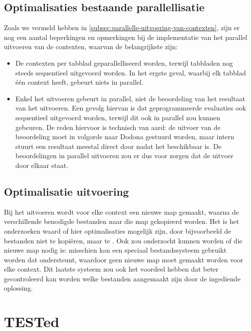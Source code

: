\subsection{Optimalisaties bestaande parallellisatie}\label{subsec:optimalisaties-bestaande-parallellisatie}

Zoals we vermeld hebben in \cref{subsec:parallelle-uitvoering-van-contexten}, zijn er nog een aantal beperkingen en opmerkingen bij de implementatie van het parallel uitvoeren van de contexten, waarvan de belangrijkste zijn:

\begin{itemize}
    \item De contexten per tabblad geparallelliseerd worden, terwijl tabbladen nog steeds sequentieel uitgevoerd worden.
    In het ergste geval, waarbij elk tabblad één context heeft, gebeurt niets in parallel.
    \item Enkel het uitvoeren gebeurt in parallel, niet de beoordeling van het resultaat van het uitvoeren.
    Een gevolg hiervan is dat geprogrammeerde evaluaties ook sequentieel uitgevoerd worden, terwijl dit ook in parallel zou kunnen gebeuren.
    De reden hiervoor is technisch van aard: de uitvoer van de beoordeling moet in volgorde naar Dodona gestuurd worden, maar intern stuurt \tested{} een resultaat meestal direct door nadat het beschikbaar is.
    De beoordelingen in parallel uitvoeren zou er dus voor zorgen dat de uitvoer door elkaar staat.
\end{itemize}

\subsection{Optimalisatie uitvoering}\label{subsec:optimalisatie-uitvoering}

Bij het uitvoeren wordt voor elke context een nieuwe map gemaakt, waarna de verschillende benodigde bestanden naar die map gekopieerd worden.
Het is het onderzoeken waard of hier optimalisaties mogelijk zijn, door bijvoorbeeld de bestanden niet te kopiëren, maar te .
Ook zou onderzocht kunnen worden of die nieuwe map nodig is: misschien kan een speciaal bestandssysteem gebruikt worden dat  ondersteunt, waardoor geen nieuwe map moet gemaakt worden voor elke context.
Dit laatste systeem zou ook het voordeel hebben dat beter gecontroleerd kan worden welke bestanden aangemaakt zijn door de ingediende oplossing.

\section{TESTed}\label{sec:beperkingen-tested}

